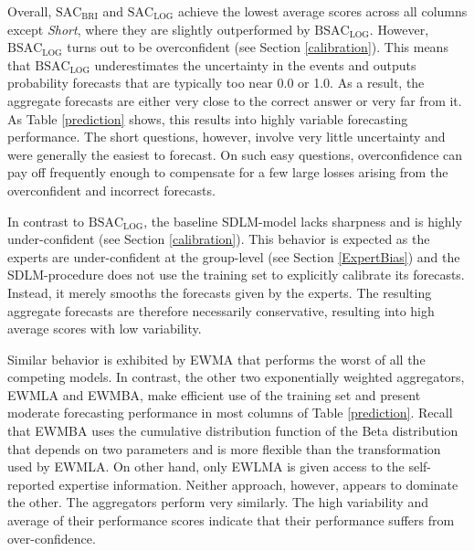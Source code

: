 \documentclass[aoas, preprint]{imsart}
\numberwithin{equation}{section}
\theoremstyle{plain}
\begin{document}
Overall, $\text{SAC}_{\text{BRI}}$ and $\text{SAC}_{\text{LOG}}$ achieve the lowest average scores across all columns except \textit{Short}, where they are slightly outperformed by $\text{BSAC}_{\text{LOG}}$.  However, $\text{BSAC}_{\text{LOG}}$ turns out to be overconfident (see Section \ref{calibration}). This means that $\text{BSAC}_{\text{LOG}}$ underestimates the uncertainty in the events and outputs probability forecasts that are typically too near 0.0 or 1.0. As a result, the aggregate forecasts are either very close to the correct answer or very far from it.  As Table \ref{prediction} shows, this results into highly variable forecasting performance. The short questions, however, involve very little uncertainty and were generally the easiest to forecast. On such easy questions, overconfidence can pay off frequently enough to compensate for a few large losses arising from the overconfident and incorrect forecasts. 

In contrast to $\text{BSAC}_{\text{LOG}}$, the baseline SDLM-model lacks sharpness and is highly under-confident (see Section \ref{calibration}). This behavior is expected as the experts are under-confident at the group-level (see Section \ref{ExpertBias}) and the SDLM-procedure does not use the training set to explicitly calibrate its forecasts. Instead, it merely smooths the forecasts given by the experts. The resulting aggregate forecasts are therefore necessarily conservative, resulting into high average scores with low variability. 

 Similar behavior is exhibited by EWMA that performs the worst of all the competing models. In contrast, the other two exponentially weighted aggregators, EWMLA and EWMBA, make efficient use of the training set and present moderate forecasting performance in most columns of Table \ref{prediction}. Recall that EWMBA uses the cumulative distribution function of the Beta distribution that depends on two parameters and is more flexible than the transformation used by EWMLA. On other hand, only EWLMA is given access to the self-reported expertise information. Neither approach, however, appears to dominate the other. The aggregators perform very similarly. The high variability and average of their performance scores indicate that their performance suffers from over-confidence.


\end{document}
